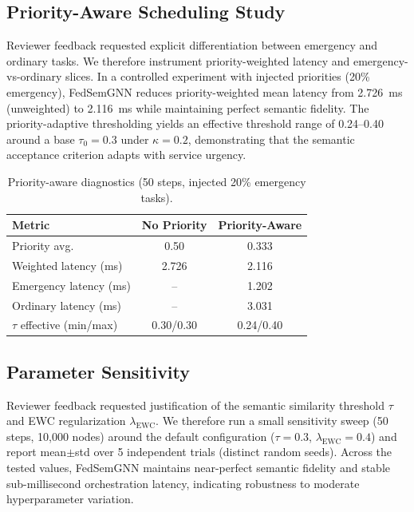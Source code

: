 \documentclass[conference]{IEEEtran}
\begin{document}
		\subsection{Priority-Aware Scheduling Study}
		Reviewer feedback requested explicit differentiation between emergency and ordinary tasks. We therefore instrument priority-weighted latency and emergency-vs-ordinary slices. In a controlled experiment with injected priorities (20\% emergency), FedSemGNN reduces priority-weighted mean latency from 2.726~ms (unweighted) to 2.116~ms while maintaining perfect semantic fidelity. The priority-adaptive thresholding yields an effective threshold range of 0.24--0.40 around a base $\tau_0{=}0.3$ under $\kappa{=}0.2$, demonstrating that the semantic acceptance criterion adapts with service urgency.
		
		\begin{table}[t]
			\centering
			\caption{Priority-aware diagnostics (50 steps, injected 20\% emergency tasks).}
			\label{tab:priority_study}
			\small
			\begin{tabular}{lcc}
				\toprule
				\textbf{Metric} & \textbf{No Priority} & \textbf{Priority-Aware} \\
				\midrule
				Priority avg. & 0.50 & 0.333 \\
				Weighted latency (ms) & 2.726 & 2.116 \\
				Emergency latency (ms) & -- & 1.202 \\
				Ordinary latency (ms) & -- & 3.031 \\
				$\tau$ effective (min/max) & 0.30/0.30 & 0.24/0.40 \\
				\bottomrule
			\end{tabular}
		\end{table}
		
		\subsection{Parameter Sensitivity}
		Reviewer feedback requested justification of the semantic similarity threshold $\tau$ and EWC regularization $\lambda_{\mathrm{EWC}}$. We therefore run a small sensitivity sweep (50 steps, 10{,}000 nodes) around the default configuration ($\tau{=}0.3$, $\lambda_{\mathrm{EWC}}{=}0.4$) and report mean$\pm$std over 5 independent trials (distinct random seeds). Across the tested values, FedSemGNN maintains near-perfect semantic fidelity and stable sub-millisecond orchestration latency, indicating robustness to moderate hyperparameter variation.
		
\end{document}
